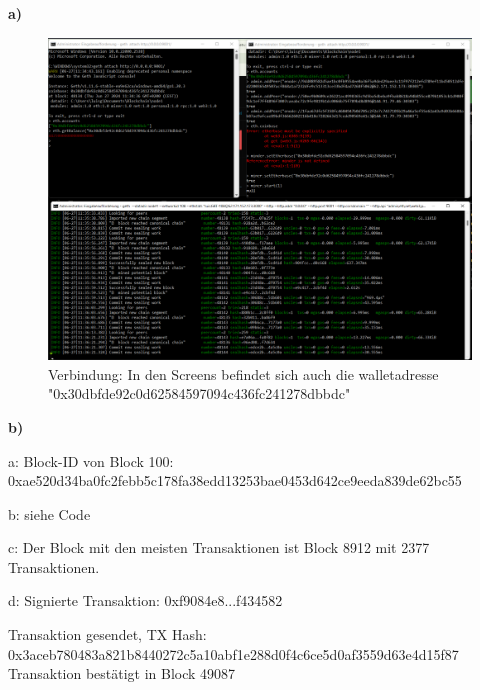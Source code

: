 \documentclass[german]{../uebung}
\begin{document}
\begin{exercise}{1}
    \textbf{a)}
    \begin{figure}[h]
        \centering
        \includegraphics*[scale=.5]{Aufgabe6a.png}
        \caption{Verbindung: In den Screens befindet sich auch die walletadresse "0x30dbfde92c0d62584597094c436fc241278dbbdc"}
    \end{figure}

    \textbf{b)}

    a: Block-ID von Block 100: 0xae520d34ba0fc2febb5c178fa38edd13253bae0453d642ce9eeda839de62bc55

    b: siehe Code

    c: Der Block mit den meisten Transaktionen ist Block 8912 mit 2377 Transaktionen.

    d: Signierte Transaktion: 0xf9084e8...f434582

    Transaktion gesendet, TX Hash: 0x3aceb780483a821b8440272c5a10abf1e288d0f4c6ce5d0af3559d63e4d15f87
    Transaktion bestätigt in Block 49087


\end{exercise}
\end{document}
